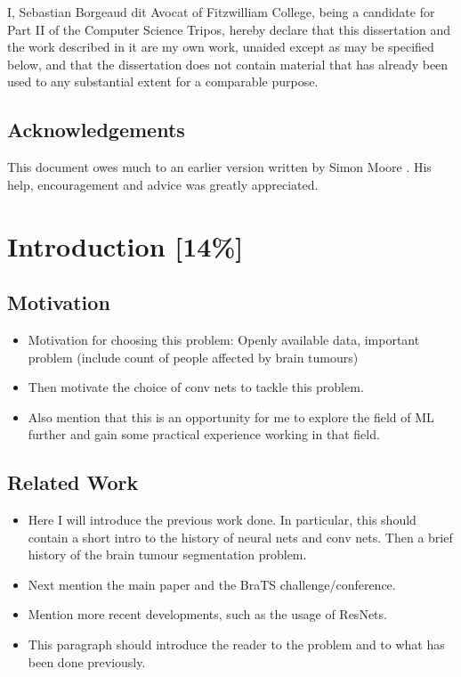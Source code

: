 \documentclass[12pt,a4paper,twoside,openright]{report}
\begin{document}
I, Sebastian Borgeaud dit Avocat of Fitzwilliam College, being a candidate for Part II of the Computer Science Tripos, hereby declare
that this dissertation and the work described in it are my own work,
unaided except as may be specified below, and that the dissertation
does not contain material that has already been used to any substantial
extent for a comparable purpose.

\bigskip
{}

\medskip
{}

\tableofcontents

\listoffigures

\newpage
\section*{Acknowledgements}

This document owes much to an earlier version written by Simon Moore
\cite{Moore95}.  His help, encouragement and advice was greatly 
appreciated.


\pagestyle{headings}

\chapter{Introduction [14\%]}
\section{Motivation}
\begin{itemize}
	\item Motivation for choosing this problem: Openly available data, important problem (include count of people affected by brain tumours)
	\item Then motivate the choice of conv nets to tackle this problem.
	\item Also mention that this is an opportunity for me to explore the field of ML further and gain some practical experience working in that field.
\end{itemize}

\section{Related Work}
\begin{itemize}
	\item Here I will introduce the previous work done. In particular, this should contain a short intro to the history of neural nets and conv nets. Then a brief history of the brain tumour segmentation problem.
	\item Next mention the main paper \cite{pereira} and the BraTS challenge/conference.
	\item Mention more recent developments, such as the usage of ResNets.
	\item This paragraph should introduce the reader to the problem and to what has been done previously.
\end{itemize}
\end{document}
